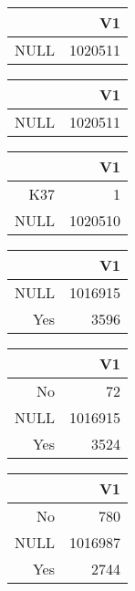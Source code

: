\bigskip\bigskip
\centering
\begin{tabular}{rr}
  \hline
 & V1 \\ 
  \hline
NULL & 1020511 \\ 
   \hline
\end{tabular}

\bigskip\bigskip
\centering
\begin{tabular}{rr}
  \hline
 & V1 \\ 
  \hline
NULL & 1020511 \\ 
   \hline
\end{tabular}

\bigskip\bigskip
\centering
\begin{tabular}{rr}
  \hline
 & V1 \\ 
  \hline
K37 &   1 \\ 
  NULL & 1020510 \\ 
   \hline
\end{tabular}

\bigskip\bigskip
\centering
\begin{tabular}{rr}
  \hline
 & V1 \\ 
  \hline
NULL & 1016915 \\ 
  Yes & 3596 \\ 
   \hline
\end{tabular}

\bigskip\bigskip
\centering
\begin{tabular}{rr}
  \hline
 & V1 \\ 
  \hline
No &  72 \\ 
  NULL & 1016915 \\ 
  Yes & 3524 \\ 
   \hline
\end{tabular}

\bigskip\bigskip
\centering
\begin{tabular}{rr}
  \hline
 & V1 \\ 
  \hline
No & 780 \\ 
  NULL & 1016987 \\ 
  Yes & 2744 \\ 
   \hline
\end{tabular}


